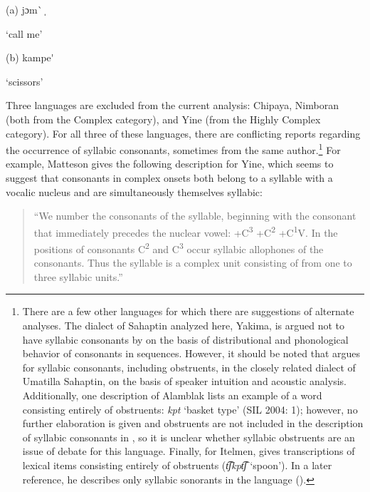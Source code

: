 (a)   jɔm\`{} ̩



  ‘call me’



(b)  kampe\'{} 



  ‘scissors’



\citep[38]{Ameka1991}

\z


  Three languages are excluded from the current analysis: Chipaya, Nimboran (both from the Complex category), and Yine (from the Highly Complex category). For all three of these languages, there are conflicting reports regarding the occurrence of syllabic consonants, sometimes from the same author.\footnote{ \textrm{There are a few other languages for which there are suggestions of alternate analyses. The dialect of Sahaptin analyzed here, Yakima, is argued not to have syllabic consonants by \citet{HargusBeavert2006} on the basis of distributional and phonological behavior of consonants in sequences. However, it should be noted that \citet{Minthorn2005} argues for syllabic consonants, including obstruents, in the closely related dialect of Umatilla Sahaptin, on the basis of speaker intuition and acoustic analysis. Additionally, one description of Alamblak lists an example of a word consisting entirely of obstruents:} \textrm{\textit{kpt}} \textrm{‘basket type’ (SIL 2004: 1); however, no further elaboration is given and obstruents are not included in the description of syllabic consonants in \citet{Bruce1984}, so it is unclear whether syllabic obstruents are an issue of debate for this language. Finally, for Itelmen, \citet[42]{Volodin1976} gives transcriptions of lexical items consisting entirely of obstruents (}\textrm{\textit{t͡ʃkpt͡ʃ} }\textrm{‘spoon’). In a later reference, he describes only syllabic sonorants in the language (\citealt{GeorgVolodin1999}).}} For example, Matteson gives the following description for Yine, which seems to suggest that consonants in complex onsets both belong to a syllable with a vocalic nucleus and are simultaneously themselves syllabic:


\begin{quote}
“We number the consonants of the syllable, beginning with the consonant that immediately precedes the nuclear vowel: +C\textsuperscript{3} +C\textsuperscript{2} +C\textsuperscript{1}V. In the positions of consonants C\textsuperscript{2} and C\textsuperscript{3} occur syllabic allophones of the consonants. Thus the syllable is a complex unit consisting of from one to three syllabic units.” 



\citep[23]{Matteson1965}
\end{quote}


